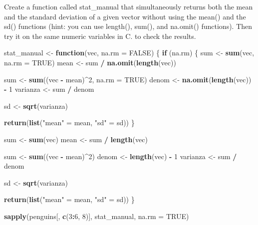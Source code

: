 \documentclass[
]{article}
\newenvironment{Shaded}{\begin{snugshade}}{\end{snugshade}}
\newcommand{\ControlFlowTok}[1]{\textcolor[rgb]{0.13,0.29,0.53}{\textbf{#1}}}
\newcommand{\DataTypeTok}[1]{\textcolor[rgb]{0.13,0.29,0.53}{#1}}
\newcommand{\DecValTok}[1]{\textcolor[rgb]{0.00,0.00,0.81}{#1}}
\newcommand{\KeywordTok}[1]{\textcolor[rgb]{0.13,0.29,0.53}{\textbf{#1}}}
\newcommand{\NormalTok}[1]{#1}
\newcommand{\OperatorTok}[1]{\textcolor[rgb]{0.81,0.36,0.00}{\textbf{#1}}}
\newcommand{\OtherTok}[1]{\textcolor[rgb]{0.56,0.35,0.01}{#1}}
\newcommand{\StringTok}[1]{\textcolor[rgb]{0.31,0.60,0.02}{#1}}
\begin{document}
Create a function called stat\_manual that simultaneously returns both
the mean and the standard deviation of a given vector without using the
mean() and the sd() functions (hint: you can use length(), sum(), and
na.omit() functions). Then try it on the same numeric variables in C. to
check the results.

\begin{Shaded}
\begin{Highlighting}[]
\NormalTok{stat\_manual \textless{}{-}}\StringTok{ }\ControlFlowTok{function}\NormalTok{(vec, }\DataTypeTok{na.rm =} \OtherTok{FALSE}\NormalTok{) \{}
  \ControlFlowTok{if}\NormalTok{ (na.rm) \{}
\NormalTok{    sum \textless{}{-}}\StringTok{ }\KeywordTok{sum}\NormalTok{(vec, }\DataTypeTok{na.rm =} \OtherTok{TRUE}\NormalTok{)}
\NormalTok{    mean \textless{}{-}}\StringTok{ }\NormalTok{sum }\OperatorTok{/}\StringTok{ }\KeywordTok{na.omit}\NormalTok{(}\KeywordTok{length}\NormalTok{(vec))}

\NormalTok{    sum \textless{}{-}}\StringTok{ }\KeywordTok{sum}\NormalTok{((vec }\OperatorTok{{-}}\StringTok{ }\NormalTok{mean)}\OperatorTok{\^{}}\DecValTok{2}\NormalTok{, }\DataTypeTok{na.rm =} \OtherTok{TRUE}\NormalTok{)}
\NormalTok{    denom \textless{}{-}}\StringTok{ }\KeywordTok{na.omit}\NormalTok{(}\KeywordTok{length}\NormalTok{(vec)) }\OperatorTok{{-}}\StringTok{ }\DecValTok{1}
\NormalTok{    varianza \textless{}{-}}\StringTok{ }\NormalTok{sum }\OperatorTok{/}\StringTok{ }\NormalTok{denom}

\NormalTok{    sd \textless{}{-}}\StringTok{ }\KeywordTok{sqrt}\NormalTok{(varianza)}

    \KeywordTok{return}\NormalTok{(}\KeywordTok{list}\NormalTok{(}\StringTok{"mean"}\NormalTok{ =}\StringTok{ }\NormalTok{mean, }\StringTok{"sd"}\NormalTok{ =}\StringTok{ }\NormalTok{sd))}
\NormalTok{  \}}

\NormalTok{  sum \textless{}{-}}\StringTok{ }\KeywordTok{sum}\NormalTok{(vec)}
\NormalTok{  mean \textless{}{-}}\StringTok{ }\NormalTok{sum }\OperatorTok{/}\StringTok{ }\KeywordTok{length}\NormalTok{(vec)}

\NormalTok{  sum \textless{}{-}}\StringTok{ }\KeywordTok{sum}\NormalTok{((vec }\OperatorTok{{-}}\StringTok{ }\NormalTok{mean)}\OperatorTok{\^{}}\DecValTok{2}\NormalTok{)}
\NormalTok{  denom \textless{}{-}}\StringTok{ }\KeywordTok{length}\NormalTok{(vec) }\OperatorTok{{-}}\StringTok{ }\DecValTok{1}
\NormalTok{  varianza \textless{}{-}}\StringTok{ }\NormalTok{sum }\OperatorTok{/}\StringTok{ }\NormalTok{denom}

\NormalTok{  sd \textless{}{-}}\StringTok{ }\KeywordTok{sqrt}\NormalTok{(varianza)}

  \KeywordTok{return}\NormalTok{(}\KeywordTok{list}\NormalTok{(}\StringTok{"mean"}\NormalTok{ =}\StringTok{ }\NormalTok{mean, }\StringTok{"sd"}\NormalTok{ =}\StringTok{ }\NormalTok{sd))}
\NormalTok{\}}

\KeywordTok{sapply}\NormalTok{(penguins[, }\KeywordTok{c}\NormalTok{(}\DecValTok{3}\OperatorTok{:}\DecValTok{6}\NormalTok{, }\DecValTok{8}\NormalTok{)], stat\_manual, }\DataTypeTok{na.rm =} \OtherTok{TRUE}\NormalTok{)}
\end{Highlighting}
\end{Shaded}
\end{document}
